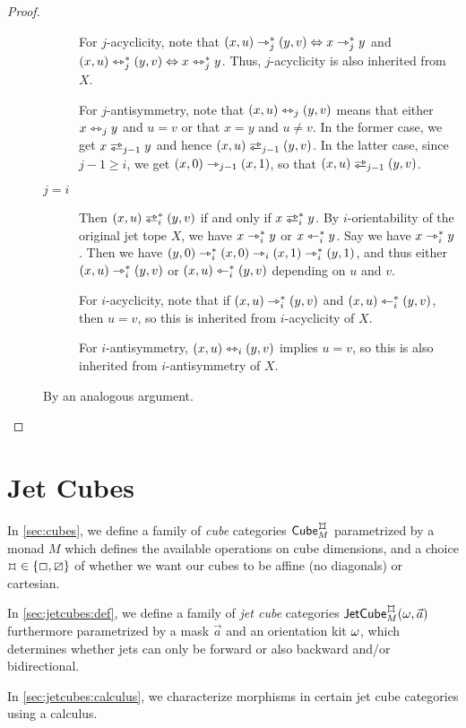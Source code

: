 \documentclass[a4paper]{memoir}
\begin{document}
\begin{proof}
\begin{description}
\begin{description}
			For $j$-acyclicity, note that $(x, u) \rightarrowtriangle_j^* (y, v) \Leftrightarrow x \rightarrowtriangle_j^* y$ and $(x, u) \leftrightarrowtriangle_j^* (y, v) \Leftrightarrow x \leftrightarrowtriangle_j^* y$. Thus, $j$-acyclicity is also inherited from $X$.
			
			For $j$-antisymmetry, note that $(x, u) \leftrightarrowtriangle_j (y, v)$ means that either $x \leftrightarrowtriangle_j y$ and $u = v$ or that $x = y$ and $u \neq v$.
			In the former case, we get $x \infrajet_{j-1} y$ and hence $(x, u) \infrajet_{j-1} (y, v)$.
			In the latter case, since $j-1 \geq i$, we get $(x, 0) \rightarrowtriangle_{j-1} (x, 1)$, so that $(x, u) \infrajet_{j-1} (y, v)$.
			\item[$j = i$] Then $(x, u) \infrajet_i^* (y, v)$ if and only if $x \infrajet_i^* y$.
			By $i$-orientability of the original jet tope $X$, we have $x \rightarrowtriangle_i^* y$ or $x \leftarrowtriangle_i^* y$. Say we have $x \rightarrowtriangle_i^* y$.
			Then we have $(y, 0) \rightarrowtriangle_i^* (x, 0) \rightarrowtriangle_i (x, 1) \rightarrowtriangle_i^* (y, 1)$, and thus either $(x, u) \rightarrowtriangle_i^* (y, v)$ or $(x, u) \leftarrowtriangle_i^* (y, v)$ depending on $u$ and $v$.
			
			For $i$-acyclicity, note that if $(x, u) \rightarrowtriangle_i^* (y, v)$ and $(x, u) \leftarrowtriangle_i^* (y, v)$, then $u = v$, so this is inherited from $i$-acyclicity of $X$.
			
			For $i$-antisymmetry, $(x, u) \leftrightarrowtriangle_i (y, v)$ implies $u = v$, so this is also inherited from $i$-antisymme\-try of $X$.
		\end{description}
		\item[\framebox{$\loch \multip \rival{\tej_i}$}] By an analogous argument. \qedhere
	\end{description}
\end{proof}

\section{Jet Cubes} \label{sec:jetcubes}
In \cref{sec:cubes}, we define a family of \emph{cube} categories $\cubecat_M^\mycubex$ parametrized by a monad $M$ which defines the available operations on cube dimensions, and a choice $\mycubex \in \accol{\affine, \cartes}$ of whether we want our cubes to be affine (no diagonals) or cartesian.

In \cref{sec:jetcubes:def}, we define a family of \emph{jet cube} categories $\jetcube{\myorix}{\mycubex}{M}{\vec a}$ furthermore parametrized by a mask $\vec a$ and an orientation kit $\omega$, which determines whether jets can only be forward or also backward and/or bidirectional.

In \cref{sec:jetcubes:calculus}, we characterize morphisms in certain jet cube categories using a calculus.
\end{document}

